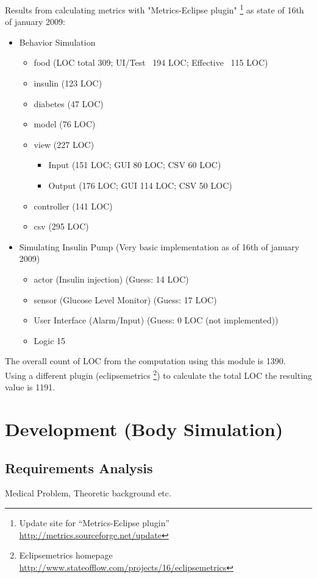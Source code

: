 \documentclass[pdflatex,a4paper,11pt,english]{scrreprt}
\begin{document}
Results from calculating metrics with "Metrics-Eclipse plugin"
\footnote{Update site for ``Metrics-Eclipse plugin''
\url{http://metrics.sourceforge.net/update}} as state of 16th of january 2009:
\begin{itemize}
  \item Behavior Simulation
  	\begin{itemize}
        \item food (LOC total 309; UI/Test ~194 LOC; Effective ~115 LOC)
        \item insulin (123 LOC)
        \item diabetes (47 LOC)
        \item model (76 LOC)
        \item view (227 LOC)
        \begin{itemize}
          \item Input (151 LOC; GUI 80 LOC; CSV 60 LOC)
          \item Output (176 LOC; GUI 114 LOC; CSV 50 LOC)
        \end{itemize}
        \item controller (141 LOC)
        \item csv (295 LOC)
    \end{itemize}
  \item Simulating Insulin Pump (Very basic implementation as of 16th of
  january 2009)
  	\begin{itemize}
        \item actor (Insulin injection) (Guess: 14 LOC)
        \item sensor (Glucose Level Monitor) (Guess: 17 LOC)
        \item User Interface (Alarm/Input) (Guess: 0 LOC (not implemented))
        \item Logic 15
    \end{itemize}
\end{itemize} 
The overall count of LOC from the computation using this module is 1390. \\
Using a different plugin (eclipsemetrics \footnote{Eclipsemetrics homepage
\url{http://www.stateofflow.com/projects/16/eclipsemetrics}}) to calculate the
total LOC the resulting value is 1191.


\chapter{Development (Body Simulation)}

\section{Requirements Analysis}
Medical Problem, Theoretic background etc.
\end{document}
